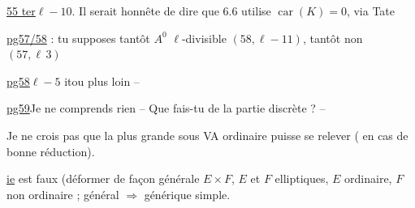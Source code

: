 \uline{55 ter}\quad $\ell-10$. Il serait honnête de dire que 6.6 utilise $\operatorname{car}(K)=0$, via Tate



\uline{pg57/58} : tu supposes tantôt $A^0$ $\ell$-divisible $(58,\ell-11)$, tantôt non $(57,\ell\,3)$

\uline{pg58}\quad $\ell-5$\quad
{}
\qquad itou plus loin --

\uline{pg59}\quad Je ne comprends rien -- Que fais-tu de la partie discrète ? --

Je ne crois pas que la plus grande  sous VA ordinaire puisse se relever ( en cas de bonne réduction).

\uline{ie} est faux (déformer de façon générale $E\times F$, $E$ et $F$ elliptiques, $E$ ordinaire, $F$ non ordinaire ; général $\Rightarrow$ générique simple.

